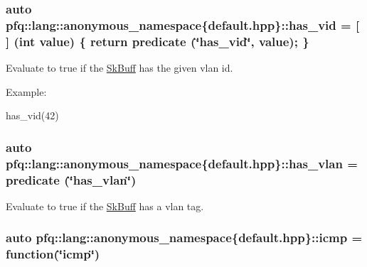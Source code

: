 \subsubsection[{\texorpdfstring{has\+\_\+vid}{has_vid}}]{\setlength{\rightskip}{0pt plus 5cm}auto pfq\+::lang\+::anonymous\+\_\+namespace\{default.\+hpp\}\+::has\+\_\+vid = \mbox{[}$\,$\mbox{]} (int value) \{ return {\bf predicate} (\char`\"{}has\+\_\+vid\char`\"{}, value); \}}\hypertarget{namespacepfq_1_1lang_1_1anonymous__namespace_02default_8hpp_03_a99c204d8095fdccd50d4cb24d32e5b5b}{}\label{namespacepfq_1_1lang_1_1anonymous__namespace_02default_8hpp_03_a99c204d8095fdccd50d4cb24d32e5b5b}


Evaluate to {\ttfamily true} if the \hyperlink{structpfq_1_1lang_1_1SkBuff}{Sk\+Buff} has the given vlan id. 

Example\+:

has\+\_\+vid(42) 
\subsubsection[{\texorpdfstring{has\+\_\+vlan}{has_vlan}}]{\setlength{\rightskip}{0pt plus 5cm}auto pfq\+::lang\+::anonymous\+\_\+namespace\{default.\+hpp\}\+::has\+\_\+vlan = {\bf predicate} (\char`\"{}has\+\_\+vlan\char`\"{})}\hypertarget{namespacepfq_1_1lang_1_1anonymous__namespace_02default_8hpp_03_a1f0378ddfa90777d11ffae5fbb57b4e0}{}\label{namespacepfq_1_1lang_1_1anonymous__namespace_02default_8hpp_03_a1f0378ddfa90777d11ffae5fbb57b4e0}


Evaluate to {\ttfamily true} if the \hyperlink{structpfq_1_1lang_1_1SkBuff}{Sk\+Buff} has a vlan tag. 

\subsubsection[{\texorpdfstring{icmp}{icmp}}]{\setlength{\rightskip}{0pt plus 5cm}auto pfq\+::lang\+::anonymous\+\_\+namespace\{default.\+hpp\}\+::icmp = {\bf function}(\char`\"{}icmp\char`\"{})}\hypertarget{namespacepfq_1_1lang_1_1anonymous__namespace_02default_8hpp_03_a3becf93771a800904f002e39b1cc388f}{}\label{namespacepfq_1_1lang_1_1anonymous__namespace_02default_8hpp_03_a3becf93771a800904f002e39b1cc388f}


